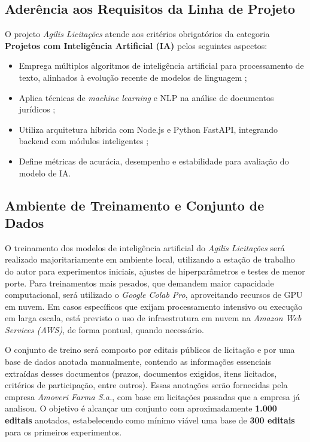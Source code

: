 \subsection{Aderência aos Requisitos da Linha de Projeto}

O projeto \textit{Agilis Licitações} atende aos critérios obrigatórios da categoria \textbf{Projetos com Inteligência Artificial (IA)} pelos seguintes aspectos:

\begin{itemize}
    \item Emprega múltiplos algoritmos de inteligência artificial para processamento de texto, alinhados à evolução recente de modelos de linguagem \cite{devlin_bert_2019, chalkidis_legalbert_2020};
    \item Aplica técnicas de \textit{machine learning} e NLP na análise de documentos jurídicos \cite{hendrycks_lexnlp_2020};
    \item Utiliza arquitetura híbrida com Node.js e Python FastAPI, integrando backend com módulos inteligentes \cite{nodejs_docs_2024, fastapi_docs_2024};
    \item Define métricas de acurácia, desempenho e estabilidade para avaliação do modelo de IA.
\end{itemize}


\subsection{Ambiente de Treinamento e Conjunto de Dados}

O treinamento dos modelos de inteligência artificial do \textit{Agilis Licitações} será realizado majoritariamente em ambiente local, utilizando a estação de trabalho do autor para experimentos iniciais, ajustes de hiperparâmetros e testes de menor porte. Para treinamentos mais pesados, que demandem maior capacidade computacional, será utilizado o \textit{Google Colab Pro}, aproveitando recursos de GPU em nuvem. Em casos específicos que exijam processamento intensivo ou execução em larga escala, está previsto o uso de infraestrutura em nuvem na \textit{Amazon Web Services (AWS)}, de forma pontual, quando necessário.

O conjunto de treino será composto por editais públicos de licitação e por uma base de dados anotada manualmente, contendo as informações essenciais extraídas desses documentos (prazos, documentos exigidos, itens licitados, critérios de participação, entre outros). Essas anotações serão fornecidas pela empresa \textit{Amoveri Farma S.a.}, com base em licitações passadas que a empresa já analisou. O objetivo é alcançar um conjunto com aproximadamente \textbf{1.000 editais} anotados, estabelecendo como mínimo viável uma base de \textbf{300 editais} para os primeiros experimentos.


